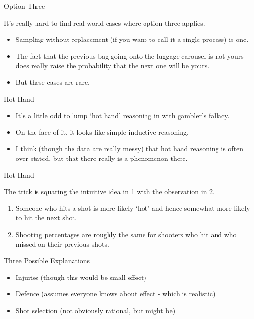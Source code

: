 \documentclass[
  ignorenonframetext,
]{beamer}
\providecommand{\tightlist}{%
  \setlength{\itemsep}{0pt}\setlength{\parskip}{0pt}}
\renewcommand{\,}{\text{, }}
\begin{document}
\begin{frame}{Option Three}
\protect\hypertarget{option-three}{}

It's really hard to find real-world cases where option three applies.

\begin{itemize}[<+->]
\tightlist
\item
  Sampling without replacement (if you want to call it a single process)
  is one.
\item
  The fact that the previous bag going onto the luggage carousel is not
  yours does really raise the probability that the next one will be
  yours.
\item
  But these cases are rare.
\end{itemize}

\end{frame}

\begin{frame}{Hot Hand}
\protect\hypertarget{hot-hand}{}

\begin{itemize}
\tightlist
\item
  It's a little odd to lump `hot hand' reasoning in with gambler's
  fallacy.
\item
  On the face of it, it looks like simple inductive reasoning.
\item
  I think (though the data are really messy) that hot hand reasoning is
  often over-stated, but that there really is a phenomenon there.
\end{itemize}

\end{frame}

\begin{frame}{Hot Hand}
\protect\hypertarget{hot-hand-1}{}

The trick is squaring the intuitive idea in 1 with the observation in 2.

\begin{enumerate}
\tightlist
\item
  Someone who hits a shot is more likely `hot' and hence somewhat more
  likely to hit the next shot.
\item
  Shooting percentages are roughly the same for shooters who hit and who
  missed on their previous shots.
\end{enumerate}

\end{frame}

\begin{frame}{Three Possible Explanations}
\protect\hypertarget{three-possible-explanations}{}

\begin{itemize}[<+->]
\tightlist
\item
  Injuries (though this would be small effect)
\item
  Defence (assumes everyone knows about effect - which is realistic)
\item
  Shot selection (not obviously rational, but might be)
\end{itemize}

\end{frame}
\end{document}
